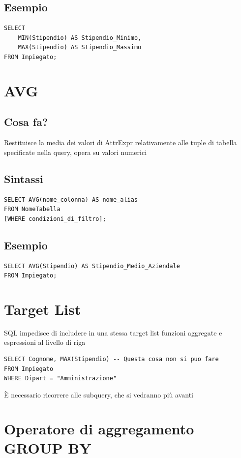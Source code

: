\subsection{Esempio}
\begin{lstlisting}[language=sql_generic]
SELECT 
    MIN(Stipendio) AS Stipendio_Minimo,
    MAX(Stipendio) AS Stipendio_Massimo
FROM Impiegato;
\end{lstlisting}

\section{AVG}
\subsection{Cosa fa?}
Restituisce la media dei valori di AttrExpr relativamente alle tuple di tabella specificate nella query, opera su valori numerici
\subsection{Sintassi}
\begin{lstlisting}[language=sql_generic]
SELECT AVG(nome_colonna) AS nome_alias
FROM NomeTabella
[WHERE condizioni_di_filtro];
\end{lstlisting}
\subsection{Esempio}
\begin{lstlisting}[language=sql_generic]
SELECT AVG(Stipendio) AS Stipendio_Medio_Aziendale
FROM Impiegato;
\end{lstlisting}

\section{Target List}
SQL impedisce di includere in una stessa target list funzioni aggregate e espressioni al livello di riga

\begin{lstlisting}[language=sql_generic]
SELECT Cognome, MAX(Stipendio) -- Questa cosa non si puo fare
FROM Impiegato
WHERE Dipart = "Amministrazione"
\end{lstlisting}

È necessario ricorrere alle subquery, che si vedranno più avanti

\section{Operatore di aggregamento GROUP BY}
